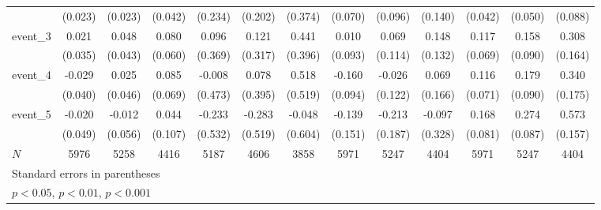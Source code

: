 {\begin{tabular}{l*{12}{c}}
            &     (0.023)         &     (0.023)         &     (0.042)         &     (0.234)         &     (0.202)         &     (0.374)         &     (0.070)         &     (0.096)         &     (0.140)         &     (0.042)         &     (0.050)         &     (0.088)         \\
[1em]
event\_3     &       0.021         &       0.048         &       0.080         &       0.096         &       0.121         &       0.441         &       0.010         &       0.069         &       0.148         &       0.117         &       0.158         &       0.308         \\
            &     (0.035)         &     (0.043)         &     (0.060)         &     (0.369)         &     (0.317)         &     (0.396)         &     (0.093)         &     (0.114)         &     (0.132)         &     (0.069)         &     (0.090)         &     (0.164)         \\
[1em]
event\_4     &      -0.029         &       0.025         &       0.085         &      -0.008         &       0.078         &       0.518         &      -0.160         &      -0.026         &       0.069         &       0.116         &       0.179\sym{*}  &       0.340         \\
            &     (0.040)         &     (0.046)         &     (0.069)         &     (0.473)         &     (0.395)         &     (0.519)         &     (0.094)         &     (0.122)         &     (0.166)         &     (0.071)         &     (0.090)         &     (0.175)         \\
[1em]
event\_5     &      -0.020         &      -0.012         &       0.044         &      -0.233         &      -0.283         &      -0.048         &      -0.139         &      -0.213         &      -0.097         &       0.168\sym{*}  &       0.274\sym{**} &       0.573\sym{***}\\
            &     (0.049)         &     (0.056)         &     (0.107)         &     (0.532)         &     (0.519)         &     (0.604)         &     (0.151)         &     (0.187)         &     (0.328)         &     (0.081)         &     (0.087)         &     (0.157)         \\
\hline
\(N\)       &        5976         &        5258         &        4416         &        5187         &        4606         &        3858         &        5971         &        5247         &        4404         &        5971         &        5247         &        4404         \\
\hline\hline
\multicolumn{13}{l}{\footnotesize Standard errors in parentheses}\\
\multicolumn{13}{l}{\footnotesize \sym{*} \(p<0.05\), \sym{**} \(p<0.01\), \sym{***} \(p<0.001\)}\\
\end{tabular}
}
